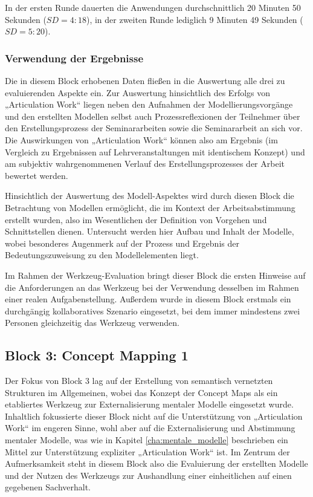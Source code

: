 In der ersten Runde dauerten die Anwendungen durchschnittlich 20 Minuten 50 Sekunden ($SD=4:18$), in der zweiten Runde lediglich 9 Minuten 49 Sekunden ($SD=5:20$).


\subsubsection{Verwendung der Ergebnisse} %
\label{ssub:2_verwendung_der_ergebnisse}

Die in diesem Block erhobenen Daten fließen in die Auswertung alle drei zu evaluierenden Aspekte ein. Zur Auswertung hinsichtlich des Erfolgs von „Articulation Work“ liegen neben den Aufnahmen der Modellierungsvorgänge und den erstellten Modellen selbst auch Prozessreflexionen der Teilnehmer über den Erstellungsprozess der Seminararbeiten sowie die Seminararbeit an sich vor. Die Auswirkungen von „Articulation Work“ können also am Ergebnis (im Vergleich zu Ergebnissen auf Lehrveranstaltungen mit identischem Konzept) und am subjektiv wahrgenommenen Verlauf des Erstellungsprozesses der Arbeit bewertet werden.

Hinsichtlich der Auswertung des Modell-Aspektes wird durch diesen Block die Betrachtung von Modellen ermöglicht, die im Kontext der Arbeitsabstimmung erstellt wurden, also im Wesentlichen der Definition von Vorgehen und Schnittstellen dienen. Untersucht werden hier Aufbau und Inhalt der Modelle, wobei besonderes Augenmerk auf der Prozess und Ergebnis der Bedeutungszuweisung zu den Modellelementen liegt.

Im Rahmen der Werkzeug-Evaluation bringt dieser Block die ersten Hinweise auf die Anforderungen an das Werkzeug bei der Verwendung desselben im Rahmen einer realen Aufgabenstellung. Außerdem wurde in diesem Block erstmals ein durchgängig kollaboratives Szenario eingesetzt, bei dem immer mindestens zwei Personen gleichzeitig das Werkzeug verwenden.


\subsection{Block 3: Concept Mapping 1}
\label{sub:eval_3}

Der Fokus von Block 3 lag auf der Erstellung von semantisch vernetzten Strukturen im Allgemeinen, wobei das Konzept der Concept Maps als ein etabliertes Werkzeug zur Externalisierung mentaler Modelle eingesetzt wurde. Inhaltlich fokussierte dieser Block nicht auf die Unterstützung von „Articulation Work“ im engeren Sinne, wohl aber auf die Externalisierung und Abstimmung mentaler Modelle, was wie in Kapitel \ref{cha:mentale_modelle} beschrieben ein Mittel zur Unterstützung expliziter „Articulation Work“ ist. Im Zentrum der Aufmerksamkeit steht in diesem Block also die Evaluierung der erstellten Modelle und der Nutzen des Werkzeugs zur Aushandlung einer einheitlichen auf einen gegebenen Sachverhalt.

